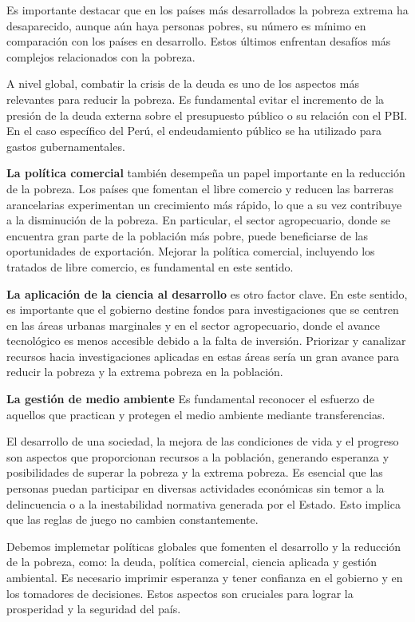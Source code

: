 \documentclass[
  jou,
  floatsintext,
  longtable,
  a4paper,
  nolmodern,
  notxfonts,
  notimes,
  12pt,
  colorlinks=true,linkcolor=blue,citecolor=blue,urlcolor=blue]{apa7}
\begin{document}
Es importante destacar que en los países más desarrollados la pobreza
extrema ha desaparecido, aunque aún haya personas pobres, su número es
mínimo en comparación con los países en desarrollo. Estos últimos
enfrentan desafíos más complejos relacionados con la pobreza.

A nivel global, combatir la crisis de la deuda es uno de los aspectos
más relevantes para reducir la pobreza. Es fundamental evitar el
incremento de la presión de la deuda externa sobre el presupuesto
público o su relación con el PBI. En el caso específico del Perú, el
endeudamiento público se ha utilizado para gastos gubernamentales.

\textbf{La política comercial} también desempeña un papel importante en
la reducción de la pobreza. Los países que fomentan el libre comercio y
reducen las barreras arancelarias experimentan un crecimiento más
rápido, lo que a su vez contribuye a la disminución de la pobreza. En
particular, el sector agropecuario, donde se encuentra gran parte de la
población más pobre, puede beneficiarse de las oportunidades de
exportación. Mejorar la política comercial, incluyendo los tratados de
libre comercio, es fundamental en este sentido.

\textbf{La aplicación de la ciencia al desarrollo} es otro factor clave.
En este sentido, es importante que el gobierno destine fondos para
investigaciones que se centren en las áreas urbanas marginales y en el
sector agropecuario, donde el avance tecnológico es menos accesible
debido a la falta de inversión. Priorizar y canalizar recursos hacia
investigaciones aplicadas en estas áreas sería un gran avance para
reducir la pobreza y la extrema pobreza en la población.

\textbf{La gestión de medio ambiente} Es fundamental reconocer el
esfuerzo de aquellos que practican y protegen el medio ambiente mediante
transferencias.

El desarrollo de una sociedad, la mejora de las condiciones de vida y el
progreso son aspectos que proporcionan recursos a la población,
generando esperanza y posibilidades de superar la pobreza y la extrema
pobreza. Es esencial que las personas puedan participar en diversas
actividades económicas sin temor a la delincuencia o a la inestabilidad
normativa generada por el Estado. Esto implica que las reglas de juego
no cambien constantemente.

Debemos implemetar políticas globales que fomenten el desarrollo y la
reducción de la pobreza, como: la deuda, política comercial, ciencia
aplicada y gestión ambiental. Es necesario imprimir esperanza y tener
confianza en el gobierno y en los tomadores de decisiones. Estos
aspectos son cruciales para lograr la prosperidad y la seguridad del
país.
\end{document}
